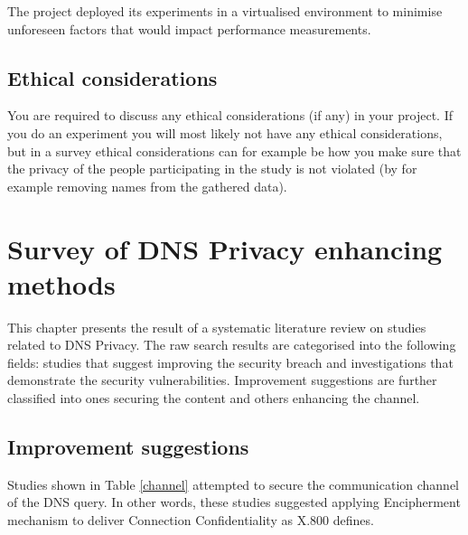 \documentclass[a4paper,12pt]{article}
\begin{document}
The project deployed its experiments in a virtualised environment to minimise unforeseen factors that would impact performance measurements.

\subsection{Ethical considerations}
You are required to discuss any ethical considerations (if any) in your project. If you do an experiment you will most likely not have any ethical considerations, but in a survey ethical considerations can for example be how you make sure that the privacy of the people participating in the study is not violated (by for example removing names from the gathered data). 

\newpage
\section{Survey of DNS Privacy enhancing methods}
This chapter presents the result of a systematic literature review on studies related to DNS Privacy. The raw search results are categorised into the following fields: studies that suggest improving the security breach and investigations that demonstrate the security vulnerabilities. Improvement suggestions are further classified into ones securing the content and others enhancing the channel.
\subsection{Improvement suggestions}
Studies shown in Table \ref{channel} attempted to secure the communication channel of the DNS query. In other words, these studies suggested applying Encipherment mechanism to deliver Connection Confidentiality as X.800 defines.
\end{document}
